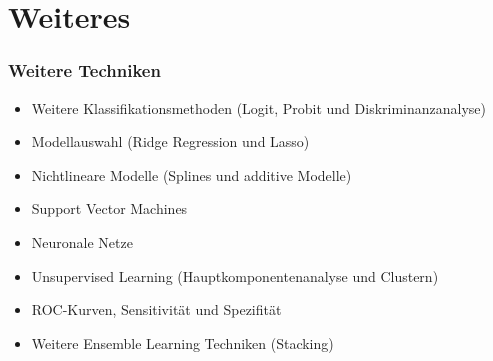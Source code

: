\documentclass{beamer}
\begin{document}
\section{Weiteres}

\begin{frame}
  \frametitle{Weitere Techniken}  
  \begin{itemize}
  \item Weitere Klassifikationsmethoden (Logit, Probit und Diskriminanzanalyse)
  \item Modellauswahl (Ridge Regression und Lasso)
  \item Nichtlineare Modelle (Splines und additive Modelle)
  \item Support Vector Machines
  \item Neuronale Netze
  \item Unsupervised Learning (Hauptkomponentenanalyse und Clustern)
  \item ROC-Kurven, Sensitivität und Spezifität
  \item Weitere Ensemble Learning Techniken (Stacking)
  \end{itemize}  
\end{frame}


\end{document}
